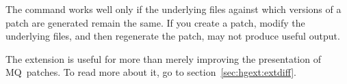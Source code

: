 \begin{note}
  The  command works well only if the underlying
  files against which versions of a patch are generated remain the
  same.  If you create a patch, modify the underlying files, and then
  regenerate the patch,  may not produce useful
  output.
\end{note}

The  extension is useful for more than merely improving
the presentation of MQ~patches.  To read more about it, go to
section~\ref{sec:hgext:extdiff}.

